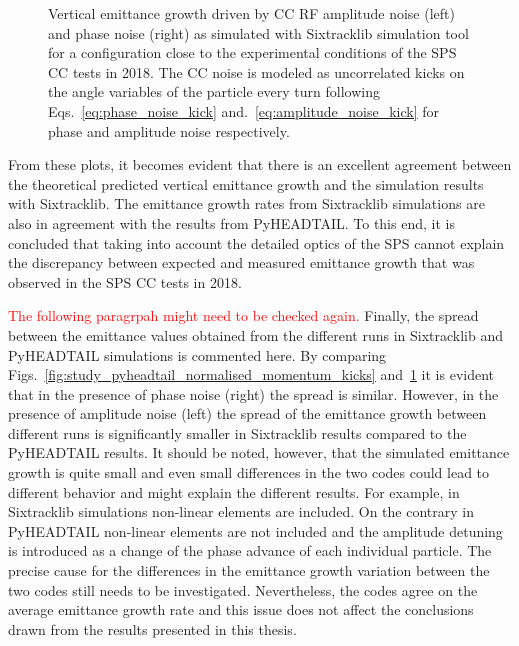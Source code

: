 \begin{figure}[htp]
\begin{subfigure}{.45\textwidth}
    \end{subfigure}
    \caption{Vertical emittance growth driven by CC RF amplitude noise (left) and phase noise (right) as simulated with Sixtracklib simulation tool for a configuration close to the experimental conditions of the SPS CC tests in 2018. The CC noise is modeled as uncorrelated kicks on the angle variables of the particle every turn following Eqs.~\eqref{eq:phase_noise_kick} and.~\eqref{eq:amplitude_noise_kick} for phase and amplitude noise respectively.}
    \label{fig:study_1_sixtracklib_normalised_momentum_kicks}
\end{figure}

From these plots, it becomes evident that there is an excellent agreement between the theoretical predicted vertical emittance growth and the simulation results with Sixtracklib. The emittance growth rates from Sixtracklib simulations are also in agreement with the results from PyHEADTAIL. To this end, it is concluded that taking into account the detailed optics of the SPS cannot explain the discrepancy between expected and measured emittance growth that was observed in the SPS CC tests in 2018.

\textcolor{red}{The following paragrpah might need to be checked again.}
Finally, the spread between the emittance values obtained from the different runs in Sixtracklib and PyHEADTAIL simulations is commented here. By comparing Figs.~\ref{fig:study_pyheadtail_normalised_momentum_kicks} and~\ref{fig:study_1_sixtracklib_normalised_momentum_kicks} it is evident that in the presence of phase noise (right) the spread is similar. However, in the presence of amplitude noise (left) the spread of the emittance growth between different runs is significantly smaller in Sixtracklib results compared to the PyHEADTAIL results. It should be noted, however, that the simulated emittance growth is quite small and even small differences in the two codes could lead to different behavior and might explain the different results. For example, in Sixtracklib simulations non-linear elements are included. On the contrary in PyHEADTAIL non-linear elements are not included and the amplitude detuning is introduced as a change of the phase advance of each individual particle. The precise cause for the differences in the emittance growth variation between the two codes still needs to be investigated. Nevertheless, the codes agree on the average emittance growth rate and this issue does not affect the conclusions drawn from the results presented in this thesis. 
 

